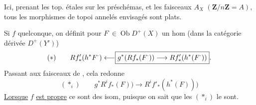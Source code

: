 Ici, prenant les top. étales sur les préschémas, et les faisceaux  $A_X$ $(\mathbf{Z}/n\mathbf{Z}=A)$, tous les morphismes de topoi annelés envisagés sont plats.


Si $f$ quelconque, on définit pour $F^\cdot\in\operatorname{Ob}D^+(X)$ un hom (dans la catégorie dérivée $D^+(Y')$)
\[
(*)\qquad \relax{Rf'_*(h^*F^\cdot)\longleftarrow}\boxed{g^*(Rf_*(F^\cdot))\longrightarrow Rf'_*(h^*(F^\cdot))}.
\]
Passant aux faisceaux de , cela redonne
\[
(*_i)\qquad g^*R^if_*(F))\longrightarrow R^if'_*(h^*(F)))
\]
\uline{Lorsque} $f$ \uline{est propre} ce sont des isom, puisque on sait que les $(*_i)$ le sont.
